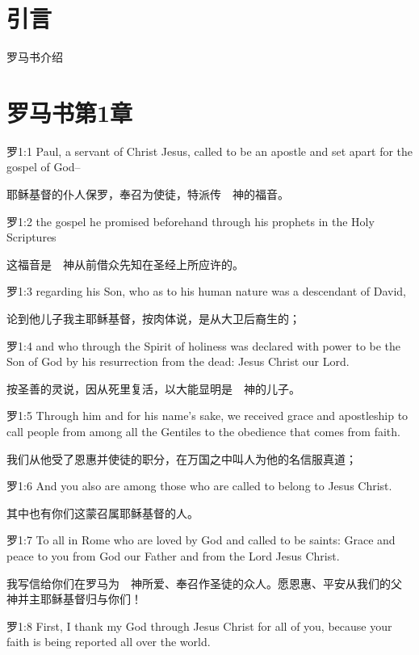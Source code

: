 \documentclass[a4paper,11pt,onecolumn,twoside]{ctexart}
\begin{document}
\begin{multicols}{2}
\tableofcontents
\section{引言}
罗马书介绍
\section{罗马书第1章}

 罗1:1
 Paul, a servant of Christ Jesus, called to be an apostle and set apart for the gospel of God--

 耶稣基督的仆人保罗，奉召为使徒，特派传　神的福音。


 罗1:2
 the gospel he promised beforehand through his prophets in the Holy Scriptures

 这福音是　神从前借众先知在圣经上所应许的。


 罗1:3
 regarding his Son, who as to his human nature was a descendant of David,

 论到他儿子我主耶稣基督，按肉体说，是从大卫后裔生的；


 罗1:4
 and who through the Spirit of holiness was declared with power to be the Son of God by his resurrection from the dead: Jesus Christ our Lord.

 按圣善的灵说，因从死里复活，以大能显明是　神的儿子。


 罗1:5
 Through him and for his name's sake, we received grace and apostleship to call people from among all the Gentiles to the obedience that comes from faith.

 我们从他受了恩惠并使徒的职分，在万国之中叫人为他的名信服真道；


 罗1:6
 And you also are among those who are called to belong to Jesus Christ.

 其中也有你们这蒙召属耶稣基督的人。


 罗1:7
 To all in Rome who are loved by God and called to be saints: Grace and peace to you from God our Father and from the Lord Jesus Christ.

 我写信给你们在罗马为　神所爱、奉召作圣徒的众人。愿恩惠、平安从我们的父　神并主耶稣基督归与你们！


 罗1:8
 First, I thank my God through Jesus Christ for all of you, because your faith is being reported all over the world.


\end{multicols}
\end{document}
